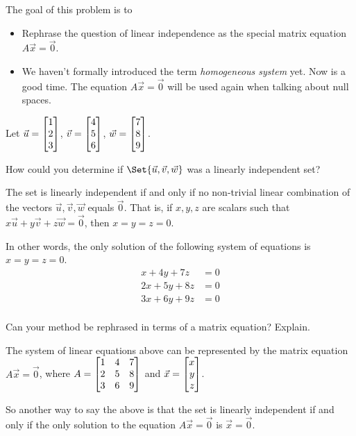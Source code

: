 \documentclass{problemset}
\newcommand{\bookonlynewpage}{\begin{bookonly}\newpage\end{bookonly}}
\begin{document}
	\bookonlynewpage
	\question
	\begin{annotation}
		\begin{goals}

			The goal of this problem is to
			\begin{itemize}
				\item Rephrase the question of linear independence as the special
					matrix equation $A\vec x=\vec 0$.
			\end{itemize}
		\end{goals}

		\begin{notes}
			\begin{itemize}
				\item We haven't formally introduced the term \emph{homogeneous system}
					yet. Now is a good time. The equation $A\vec x=\vec 0$ will be used
					again when talking about null spaces.
			\end{itemize}
		\end{notes}
	\end{annotation}
	Let $\vec u=\mat{1\\2\\3}$, $\vec v=\mat{4\\5\\6}$, $\vec w=\mat{7\\8\\9}$.
	\begin{parts}
		\item How could you determine if $\Set{\vec u,\vec v,\vec w}$ was a linearly
			independent set?
			\begin{solution}
				The set is linearly independent if and only if no non-trivial linear
				combination of the vectors $\vec u,\vec v,\vec w$ equals $\vec 0$.
				That is, if $x, y, z$ are scalars such that
				$x\vec u+y\vec v+z\vec w=\vec 0$, then $x=y=z=0$.

				In other words, the only solution of the following
				system of equations is $x=y=z=0$.
				\begin{align*}
					x + 4y + 7z &= 0 \\
					2x + 5y + 8z &= 0 \\
					3x + 6y + 9z &= 0 \\
				\end{align*}
			\end{solution}
		\item Can your method be rephrased in terms of a matrix equation? Explain.
			\begin{solution}
				The system of linear equations above can be represented by the
				matrix equation $A\vec x = \vec 0$, where $A = \mat{1&4&7\\2&5&8\\3&6&9}$
				and $\vec x=\mat{x\\y\\z}$.

				So another way to say the above is that the set is linearly independent
				if and only if the only solution to the equation $A \vec x = \vec 0$
				is $\vec x = \vec 0$.
			\end{solution}
	\end{parts}
\end{document}
